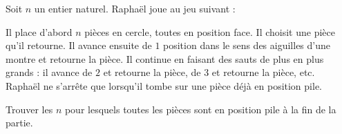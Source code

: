 Soit $n$ un entier naturel. Raphaël joue au jeu suivant :

Il place d'abord $n$ pièces en cercle, toutes en position face. Il choisit une pièce qu'il retourne. Il avance ensuite de $1$ position dans le sens des aiguilles d'une montre et retourne la pièce. Il continue en faisant des sauts de plus en plus grands : il avance de $2$ et retourne la pièce, de $3$ et retourne la pièce, etc.\\
Raphaël ne s'arrête que lorsqu'il tombe sur une pièce déjà en position pile.

Trouver les $n$ pour lesquels toutes les pièces sont en position pile à la fin de la partie.